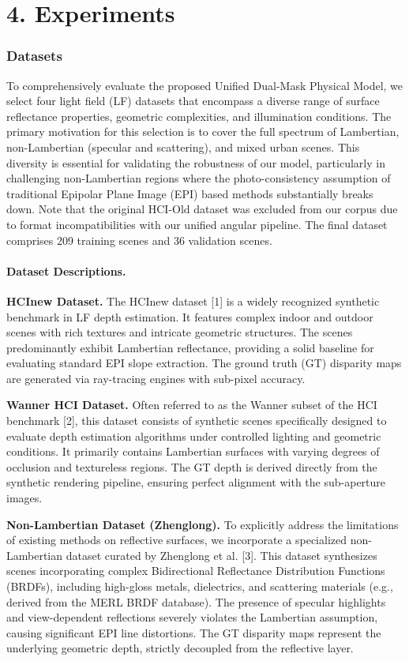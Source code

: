 \section{4. Experiments}

\subsubsection{Datasets}

To comprehensively evaluate the proposed Unified Dual-Mask Physical Model, we select four light field (LF) datasets that encompass a diverse range of surface reflectance properties, geometric complexities, and illumination conditions. The primary motivation for this selection is to cover the full spectrum of Lambertian, non-Lambertian (specular and scattering), and mixed urban scenes. This diversity is essential for validating the robustness of our model, particularly in challenging non-Lambertian regions where the photo-consistency assumption of traditional Epipolar Plane Image (EPI) based methods substantially breaks down. Note that the original HCI-Old dataset was excluded from our corpus due to format incompatibilities with our unified angular pipeline. The final dataset comprises 209 training scenes and 36 validation scenes.

\paragraph{Dataset Descriptions.}

\textbf{HCInew Dataset.} The HCInew dataset [1] is a widely recognized synthetic benchmark in LF depth estimation. It features complex indoor and outdoor scenes with rich textures and intricate geometric structures. The scenes predominantly exhibit Lambertian reflectance, providing a solid baseline for evaluating standard EPI slope extraction. The ground truth (GT) disparity maps are generated via ray-tracing engines with sub-pixel accuracy. 

\textbf{Wanner HCI Dataset.} Often referred to as the Wanner subset of the HCI benchmark [2], this dataset consists of synthetic scenes specifically designed to evaluate depth estimation algorithms under controlled lighting and geometric conditions. It primarily contains Lambertian surfaces with varying degrees of occlusion and textureless regions. The GT depth is derived directly from the synthetic rendering pipeline, ensuring perfect alignment with the sub-aperture images.

\textbf{Non-Lambertian Dataset (Zhenglong).} To explicitly address the limitations of existing methods on reflective surfaces, we incorporate a specialized non-Lambertian dataset curated by Zhenglong et al. [3]. This dataset synthesizes scenes incorporating complex Bidirectional Reflectance Distribution Functions (BRDFs), including high-gloss metals, dielectrics, and scattering materials (e.g., derived from the MERL BRDF database). The presence of specular highlights and view-dependent reflections severely violates the Lambertian assumption, causing significant EPI line distortions. The GT disparity maps represent the underlying geometric depth, strictly decoupled from the reflective layer.

